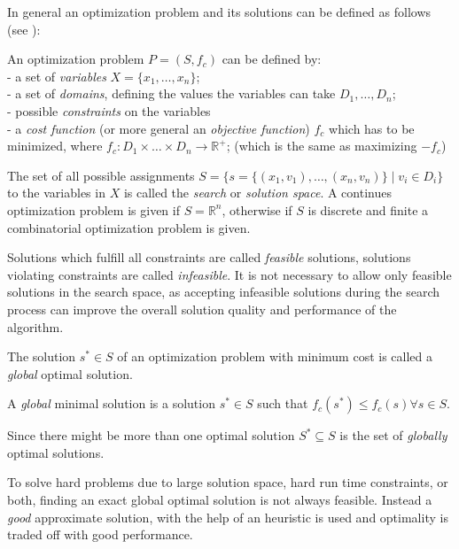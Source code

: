 In general an optimization problem and its solutions can be defined as follows (see \cite{blum2003metaheuristics}): 
\begin{definition}\label{def:problem}
An optimization problem $P = (S, f_c)$ can be defined by:\\
- a set of \emph{variables} $X = \{x_1,\dots,x_n\} $;\\
- a set of \emph{domains}, defining the values the variables can take $D_1,\dots,D_n$;\\
- possible \emph{constraints} on the variables\\
- a \emph{cost function} (or more general an \emph{objective function}) $f_c$ which has to be minimized, where $f_c:D_1 \times \dots \times D_n \rightarrow \mathbb{R}^+$; (which is the same as maximizing $-f_c$)\\
\end{definition}
The set of all possible assignments $S = \{s = \{(x_1,v_1),\dots,(x_n,v_n)\}\mid v_i \in D_i\}$ to the variables in $X$ is called the \emph{search} or \emph{solution space}.
A continues optimization problem is given if $S=\mathbb{R}^n$, otherwise if $S$ is discrete and finite a combinatorial optimization problem is given. 

Solutions which fulfill all constraints are called \emph{feasible} solutions, solutions violating constraints are called \emph{infeasible}. 
It is not necessary to allow only feasible solutions in the search space, as accepting infeasible solutions during the search process can improve the overall solution quality and performance of the algorithm.

The solution $s^*\in S$ of an optimization problem with minimum cost is called a \emph{global} optimal solution. 
\begin{definition}
 A \emph{global} minimal solution is a solution $s^* \in S$ such that
 $f_c(s^*)\leq f_c(s) \forall s \in S$. 
\end{definition}
Since there might be more than one optimal solution $S^* \subseteq S$ is the set of \emph{globally} optimal solutions.

To solve hard problems due to large solution space, hard run time constraints, or both, finding an exact global optimal solution is not always feasible. 
Instead a \emph{good} approximate solution, with the help of an heuristic is used and optimality is traded off with good performance.


